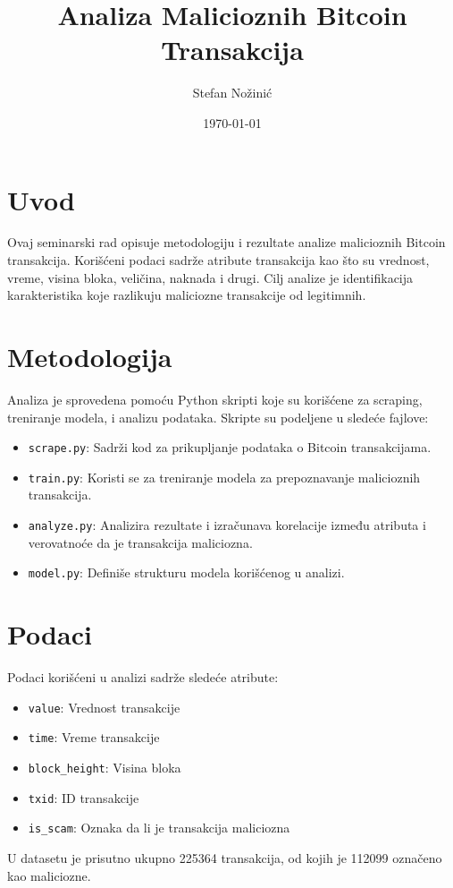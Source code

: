 \documentclass{article}
\title{Analiza Malicioznih Bitcoin Transakcija}
\author{Stefan Nožinić}
\date{\today}
\begin{document}
\maketitle

\section{Uvod}
Ovaj seminarski rad opisuje metodologiju i rezultate analize malicioznih Bitcoin transakcija. Korišćeni podaci sadrže atribute transakcija kao što su vrednost, vreme, visina bloka, veličina, naknada i drugi. Cilj analize je identifikacija karakteristika koje razlikuju maliciozne transakcije od legitimnih.

\section{Metodologija}
Analiza je sprovedena pomoću Python skripti koje su korišćene za scraping, treniranje modela, i analizu podataka. Skripte su podeljene u sledeće fajlove:
\begin{itemize}
    \item \texttt{scrape.py}: Sadrži kod za prikupljanje podataka o Bitcoin transakcijama.
    \item \texttt{train.py}: Koristi se za treniranje modela za prepoznavanje malicioznih transakcija.
    \item \texttt{analyze.py}: Analizira rezultate i izračunava korelacije između atributa i verovatnoće da je transakcija maliciozna.
    \item \texttt{model.py}: Definiše strukturu modela korišćenog u analizi.
\end{itemize}

\section{Podaci}
Podaci korišćeni u analizi sadrže sledeće atribute:
\begin{itemize}
    \item \texttt{value}: Vrednost transakcije
    \item \texttt{time}: Vreme transakcije
    \item \texttt{block\_height}: Visina bloka
    \item \texttt{txid}: ID transakcije
    \item \texttt{is\_scam}: Oznaka da li je transakcija maliciozna
\end{itemize}
U datasetu je prisutno ukupno 225364 transakcija, od kojih je 112099 označeno kao maliciozne.
\end{document}
